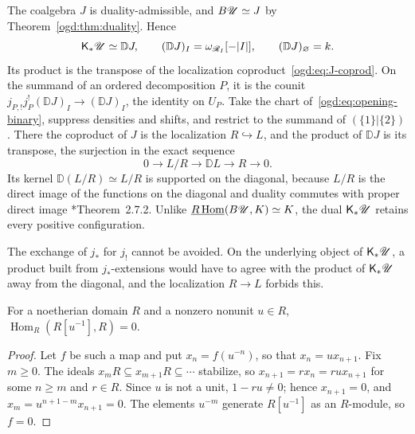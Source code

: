 \begin{example}\label{ogd:ex:dual-unit}
The coalgebra \(J\) is duality-admissible, and \(B\mathscr U\simeq J\) by Theorem~\ref{ogd:thm:duality}.
Hence
\[
 \mathsf K_*\mathscr U\simeq\mathbb DJ,\qquad
 (\mathbb DJ)_I=\omega_{\mathscr R_I}[-|I|],\qquad(\mathbb DJ)_\varnothing=k.
\]
Its product is the transpose of the localization coproduct~\eqref{ogd:eq:J-coprod}.
On the summand of an ordered decomposition \(P\), it is the counit \(j_{P,!}j_P^!(\mathbb DJ)_I\to(\mathbb DJ)_I\), the identity on \(U_P\).
Take the chart of~\eqref{ogd:eq:opening-binary}, suppress densities and shifts, and restrict to the summand of \((\{1\}|\{2\})\).
There the coproduct of \(J\) is the localization \(R\hookrightarrow L\), and the product of \(\mathbb DJ\) is its transpose, the surjection in the exact sequence
\[
 0\longrightarrow L/R\longrightarrow\mathbb DL\longrightarrow R\longrightarrow0.
\]
Its kernel \(\mathbb D(L/R)\simeq L/R\) is supported on the diagonal, because \(L/R\) is the direct image of the functions on the diagonal and duality commutes with proper direct image \cite{kd-HTT}*{Theorem~2.7.2}.
Unlike \(\underline{R\operatorname{Hom}}(B\mathscr U,K)\simeq K\), the dual \(\mathsf K_*\mathscr U\) retains every positive configuration.
\end{example}

The exchange of \(j_*\) for \(j_!\) cannot be avoided.
On the underlying object of \(\mathsf K_*\mathscr U\), a product built from \(j_*\)-extensions would have to agree with the product of \(\mathsf K_*\mathscr U\) away from the diagonal, and the localization \(R\to L\) forbids this.

\begin{lemma}\label{ogd:lem:hom-zero}
For a noetherian domain \(R\) and a nonzero nonunit \(u\in R\), \(\operatorname{Hom}_R(R[u^{-1}],R)=0\).
\end{lemma}
\begin{proof}
Let \(f\) be such a map and put \(x_n=f(u^{-n})\), so that \(x_n=ux_{n+1}\).
Fix \(m\geq0\).
The ideals \(x_mR\subseteq x_{m+1}R\subseteq\cdots\) stabilize, so \(x_{n+1}=rx_n=rux_{n+1}\) for some \(n\geq m\) and \(r\in R\).
Since \(u\) is not a unit, \(1-ru\neq0\); hence \(x_{n+1}=0\), and \(x_m=u^{n+1-m}x_{n+1}=0\).
The elements \(u^{-m}\) generate \(R[u^{-1}]\) as an \(R\)-module, so \(f=0\).
\end{proof}

